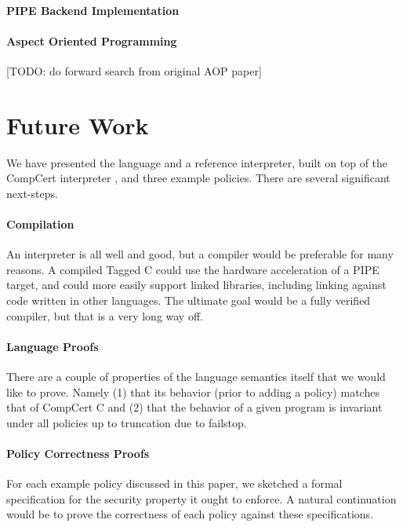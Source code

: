 \documentclass{llncs}
\begin{document}
\paragraph{PIPE Backend Implementation}

\paragraph{Aspect Oriented Programming}

[TODO: do forward search from original AOP paper]

\section{Future Work}
\label{sec:futurework}

We have presented the language and a reference interpreter, built on top of the CompCert interpreter
\cite{Leroy09:CompCert}, and three example policies. There are several significant next-steps.

\paragraph{Compilation}

An interpreter is all well and good, but a compiler would be preferable for many reasons.
A compiled Tagged C could use the hardware acceleration of a PIPE target, and could more easily
support linked libraries, including linking against code written in other languages.
The ultimate goal would be a fully verified compiler, but that is a very long way off.

\paragraph{Language Proofs}

There are a couple of properties of the language semantics itself that we would like to prove.
Namely (1) that its behavior (prior to adding a policy) matches that of CompCert C and
(2) that the behavior of a given program is invariant under all policies up to truncation due
to failstop.

\paragraph{Policy Correctness Proofs}

For each example policy discussed in this paper, we sketched a formal specification for the
security property it ought to enforce. A natural continuation would be to prove the correctness
of each policy against these specifications.
\end{document}
